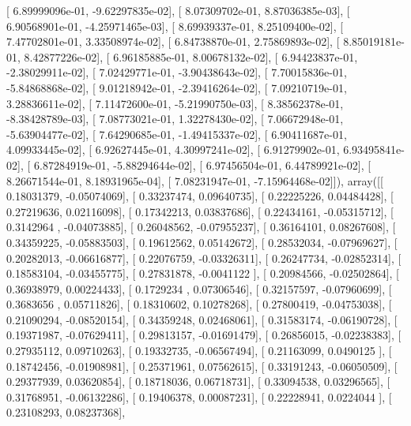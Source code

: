 \documentclass{article}
\begin{document}
       [  6.89999096e-01,  -9.62297835e-02],
       [  8.07309702e-01,   8.87036385e-03],
       [  6.90568901e-01,  -4.25971465e-03],
       [  8.69939337e-01,   8.25109400e-02],
       [  7.47702801e-01,   3.33508974e-02],
       [  6.84738870e-01,   2.75869893e-02],
       [  8.85019181e-01,   8.42877226e-02],
       [  6.96185885e-01,   8.00678132e-02],
       [  6.94423837e-01,  -2.38029911e-02],
       [  7.02429771e-01,  -3.90438643e-02],
       [  7.70015836e-01,  -5.84868868e-02],
       [  9.01218942e-01,  -2.39416264e-02],
       [  7.09210719e-01,   3.28836611e-02],
       [  7.11472600e-01,  -5.21990750e-03],
       [  8.38562378e-01,  -8.38428789e-03],
       [  7.08773021e-01,   1.32278430e-02],
       [  7.06672948e-01,  -5.63904477e-02],
       [  7.64290685e-01,  -1.49415337e-02],
       [  6.90411687e-01,   4.09933445e-02],
       [  6.92627445e-01,   4.30997241e-02],
       [  6.91279902e-01,   6.93495841e-02],
       [  6.87284919e-01,  -5.88294644e-02],
       [  6.97456504e-01,   6.44789921e-02],
       [  8.26671544e-01,   8.18931965e-04],
       [  7.08231947e-01,  -7.15964468e-02]]), array([[ 0.18031379, -0.05074069],
       [ 0.33237474,  0.09640735],
       [ 0.22225226,  0.04484428],
       [ 0.27219636,  0.02116098],
       [ 0.17342213,  0.03837686],
       [ 0.22434161, -0.05315712],
       [ 0.3142964 , -0.04073885],
       [ 0.26048562, -0.07955237],
       [ 0.36164101,  0.08267608],
       [ 0.34359225, -0.05883503],
       [ 0.19612562,  0.05142672],
       [ 0.28532034, -0.07969627],
       [ 0.20282013, -0.06616877],
       [ 0.22076759, -0.03326311],
       [ 0.26247734, -0.02852314],
       [ 0.18583104, -0.03455775],
       [ 0.27831878, -0.0041122 ],
       [ 0.20984566, -0.02502864],
       [ 0.36938979,  0.00224433],
       [ 0.1729234 ,  0.07306546],
       [ 0.32157597, -0.07960699],
       [ 0.3683656 ,  0.05711826],
       [ 0.18310602,  0.10278268],
       [ 0.27800419, -0.04753038],
       [ 0.21090294, -0.08520154],
       [ 0.34359248,  0.02468061],
       [ 0.31583174, -0.06190728],
       [ 0.19371987, -0.07629411],
       [ 0.29813157, -0.01691479],
       [ 0.26856015, -0.02238383],
       [ 0.27935112,  0.09710263],
       [ 0.19332735, -0.06567494],
       [ 0.21163099,  0.0490125 ],
       [ 0.18742456, -0.01908981],
       [ 0.25371961,  0.07562615],
       [ 0.33191243, -0.06050509],
       [ 0.29377939,  0.03620854],
       [ 0.18718036,  0.06718731],
       [ 0.33094538,  0.03296565],
       [ 0.31768951, -0.06132286],
       [ 0.19406378,  0.00087231],
       [ 0.22228941,  0.0224044 ],
       [ 0.23108293,  0.08237368],
\end{document}
